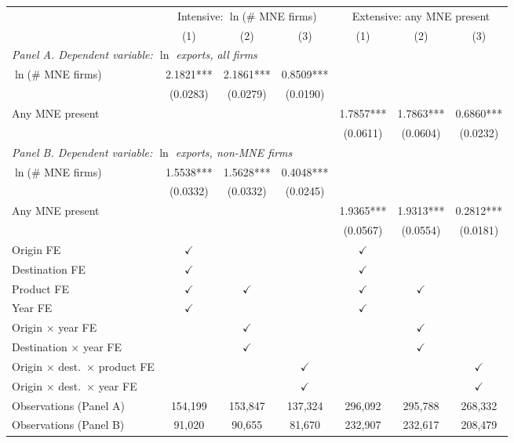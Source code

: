 \begin{tabular}{lcccccc} \hline
 & \multicolumn{3}{c}{Intensive: $\ln$(\# MNE firms)} & \multicolumn{3}{c}{Extensive: any MNE present} \\
 & (1) & (2) & (3) & (1) & (2) & (3) \\ \hline
\multicolumn{7}{l}{\textit{Panel A. Dependent variable: $\ln$ exports, all firms}} \\
$\ln$(\# MNE firms) & 2.1821*** & 2.1861*** & 0.8509*** &  &  &  \\
 & (0.0283) & (0.0279) & (0.0190) &  &  &  \\
Any MNE present &  &  &  & 1.7857*** & 1.7863*** & 0.6860*** \\
 &  &  &  & (0.0611) & (0.0604) & (0.0232) \\
\midrule
\multicolumn{7}{l}{\textit{Panel B. Dependent variable: $\ln$ exports, non-MNE firms}} \\
$\ln$(\# MNE firms) & 1.5538*** & 1.5628*** & 0.4048*** &  &  &  \\
 & (0.0332) & (0.0332) & (0.0245) &  &  &  \\
Any MNE present &  &  &  & 1.9365*** & 1.9313*** & 0.2812*** \\
 &  &  &  & (0.0567) & (0.0554) & (0.0181) \\
\hline
Origin FE & $\checkmark$ &  &  & $\checkmark$ &  &  \\
Destination FE & $\checkmark$ &  &  & $\checkmark$ &  &  \\
Product FE & $\checkmark$ & $\checkmark$ &  & $\checkmark$ & $\checkmark$ &  \\
Year FE & $\checkmark$ &  &  & $\checkmark$ &  &  \\
Origin $\times$ year FE &  & $\checkmark$ &  &  & $\checkmark$ &  \\
Destination $\times$ year FE &  & $\checkmark$ &  &  & $\checkmark$ &  \\
Origin $\times$ dest.\ $\times$ product FE &  &  & $\checkmark$ &  &  & $\checkmark$ \\
Origin $\times$ dest.\ $\times$ year FE &  &  & $\checkmark$ &  &  & $\checkmark$ \\
Observations (Panel A) & 154,199 & 153,847 & 137,324 & 296,092 & 295,788 & 268,332 \\
Observations (Panel B) & 91,020 & 90,655 & 81,670 & 232,907 & 232,617 & 208,479 \\
\hline
\end{tabular}
